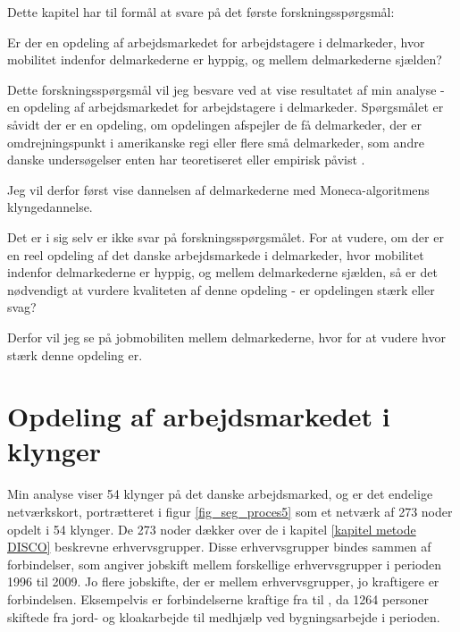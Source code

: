 Dette kapitel har til formål at svare på det første forskningsspørgsmål:

\begin{tcolorbox}[title=Forskningspørgsmål,
subtitle style={boxrule=0.4pt} ]
	 Er der en opdeling af arbejdsmarkedet for arbejdstagere i delmarkeder, hvor mobilitet indenfor delmarkederne er hyppig, og mellem delmarkederne sjælden?
\end{tcolorbox}

Dette forskningsspørgsmål vil jeg besvare ved at vise resultatet af min analyse - en opdeling af arbejdsmarkedet for arbejdstagere i delmarkeder. Spørgsmålet er såvidt der er en opdeling, om opdelingen afspejler de få delmarkeder, der er omdrejningspunkt i amerikanske regi \parencite{Piore1980, Gordon1982} eller flere små delmarkeder, som andre danske undersøgelser enten har teoretiseret eller empirisk påvist \parencite{Boje1985, Touboel2013}.

Jeg vil derfor først vise dannelsen af delmarkederne med Moneca-algoritmens klyngedannelse.

Det er i sig selv er ikke svar på forskningsspørgsmålet. For at vudere, om der er en reel opdeling af det danske arbejdsmarkede i delmarkeder, hvor mobilitet indenfor delmarkederne er hyppig, og mellem delmarkederne sjælden, så er det nødvendigt at vurdere kvaliteten af denne opdeling - er opdelingen stærk eller svag?

Derfor vil jeg se på jobmobiliten mellem delmarkederne, hvor for at vudere hvor stærk denne opdeling er. 

\section{Opdeling af arbejdsmarkedet i klynger \label{delanalyse1_endelige mobilitetskort}}

Min analyse viser 54 klynger på det danske arbejdsmarked, og er det endelige netværkskort, portrætteret i figur \ref{fig_seg_proces5} som et netværk af 273 noder opdelt i 54 klynger. De 273 noder dækker over de i kapitel \ref{kapitel metode DISCO} beskrevne erhvervsgrupper. Disse erhvervsgrupper bindes sammen af forbindelser, som angiver jobskift mellem forskellige erhvervsgrupper i perioden 1996 til 2009. Jo flere jobskifte, der er mellem erhvervsgrupper, jo kraftigere er forbindelsen. Eksempelvis er forbindelserne kraftige fra  til , da 1264 personer skiftede fra jord- og kloakarbejde til medhjælp ved bygningsarbejde i perioden. 

